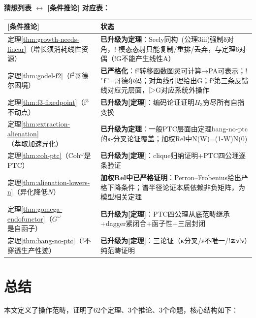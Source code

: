 \documentclass[11pt,a4paper]{article}
\newcommand{\bang}{{!}}
\begin{document}
\vspace{1em}
\noindent\textbf{猜想列表 $\leftrightarrow$ [条件推论] 对应表：}
\begin{center}
\begin{tabular}{ll}
\hline
\textbf{[条件推论]} & \textbf{状态} \\
\hline
定理\ref{thm:growth-needs-linear}（增长须消耗线性资源） & \textbf{已升级为定理}：Seely同构~\cite{seely89}(公理3iii)强制δ对角，!-模态态射只能复制/重排/丢弃，与定理6对偶（!G不能产生线性A） \\
定理\ref{thm:godel-f2}（f$^2$哥德尔困境） & \textbf{已严格化}：f²转移函数图灵可计算→PA可表示；!⌜f⌝=哥德尔码；对角线引理给出G；f³第三条反馈线对应元层面，▷G对应系统外操作 \\
定理\ref{thm:f3-fixedpoint}（f$^3$不动点） & \textbf{已升级为[定理]}：编码论证证明$H_3$穷尽所有自指变换 \\
定理\ref{thm:extraction-alienation}（萃取加速异化） & \textbf{已升级为定理}：一般PTC层面由定理bang-no-ptc的κ-分叉论证覆盖；加权Rel中N(W)=(1-W)N(0) \\
定理\ref{thm:coh-ptc}（Coh$^\omega$是PTC） & \textbf{已升级为[定理]}：clique归纳证明+PTC四公理逐条验证 \\
定理\ref{thm:alienation-lowers-n}（异化降低$N$） & \textbf{加权$\mathbf{Rel}$中已严格证明}：Perron--Frobenius给出严格下降条件；谱半径论证本质依赖非负矩阵，为模型相关定理 \\
定理\ref{thm:gomega-endofunctor}（$G^\omega$是自函子） & \textbf{已升级为[定理]}：PTC四公理从底范畴继承+dagger紧闭合+函子性+三层封闭 \\
定理\ref{thm:bang-no-ptc}（$\bang$不穿透生产性迹） & \textbf{已升级为[定理]}：三论证（κ分叉/ε不唯一/!≇ν!ν）纯范畴证明 \\
\hline
\end{tabular}
\end{center}

\section{总结}

本文定义了操作范畴，证明了62个定理、3个推论、3个命题，核心结构如下：
\end{document}
